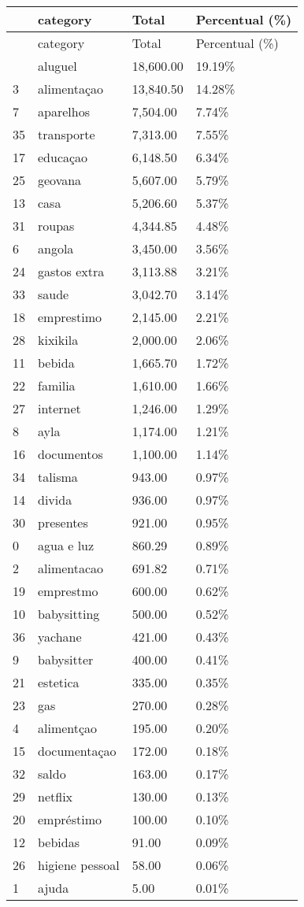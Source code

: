 \documentclass[
  8pt,
  a4paper,
  DIV=11,
  numbers=noendperiod]{scrartcl}
\begin{document}
\begin{longtable}[]{@{}llll@{}}
\caption{}\label{T_e4a42}\tabularnewline
\toprule\noalign{}
~ & category & Total & Percentual (\%) \\
\midrule\noalign{}
\endfirsthead
\toprule\noalign{}
~ & category & Total & Percentual (\%) \\
\midrule\noalign{}
\endhead
\bottomrule\noalign{}
\endlastfoot
5 & aluguel & 18,600.00 & 19.19\% \\
3 & alimentaçao & 13,840.50 & 14.28\% \\
7 & aparelhos & 7,504.00 & 7.74\% \\
35 & transporte & 7,313.00 & 7.55\% \\
17 & educaçao & 6,148.50 & 6.34\% \\
25 & geovana & 5,607.00 & 5.79\% \\
13 & casa & 5,206.60 & 5.37\% \\
31 & roupas & 4,344.85 & 4.48\% \\
6 & angola & 3,450.00 & 3.56\% \\
24 & gastos extra & 3,113.88 & 3.21\% \\
33 & saude & 3,042.70 & 3.14\% \\
18 & emprestimo & 2,145.00 & 2.21\% \\
28 & kixikila & 2,000.00 & 2.06\% \\
11 & bebida & 1,665.70 & 1.72\% \\
22 & familia & 1,610.00 & 1.66\% \\
27 & internet & 1,246.00 & 1.29\% \\
8 & ayla & 1,174.00 & 1.21\% \\
16 & documentos & 1,100.00 & 1.14\% \\
34 & talisma & 943.00 & 0.97\% \\
14 & divida & 936.00 & 0.97\% \\
30 & presentes & 921.00 & 0.95\% \\
0 & agua e luz & 860.29 & 0.89\% \\
2 & alimentacao & 691.82 & 0.71\% \\
19 & emprestmo & 600.00 & 0.62\% \\
10 & babysitting & 500.00 & 0.52\% \\
36 & yachane & 421.00 & 0.43\% \\
9 & babysitter & 400.00 & 0.41\% \\
21 & estetica & 335.00 & 0.35\% \\
23 & gas & 270.00 & 0.28\% \\
4 & alimentçao & 195.00 & 0.20\% \\
15 & documentaçao & 172.00 & 0.18\% \\
32 & saldo & 163.00 & 0.17\% \\
29 & netflix & 130.00 & 0.13\% \\
20 & empréstimo & 100.00 & 0.10\% \\
12 & bebidas & 91.00 & 0.09\% \\
26 & higiene pessoal & 58.00 & 0.06\% \\
1 & ajuda & 5.00 & 0.01\% \\
\end{longtable}
\end{document}
